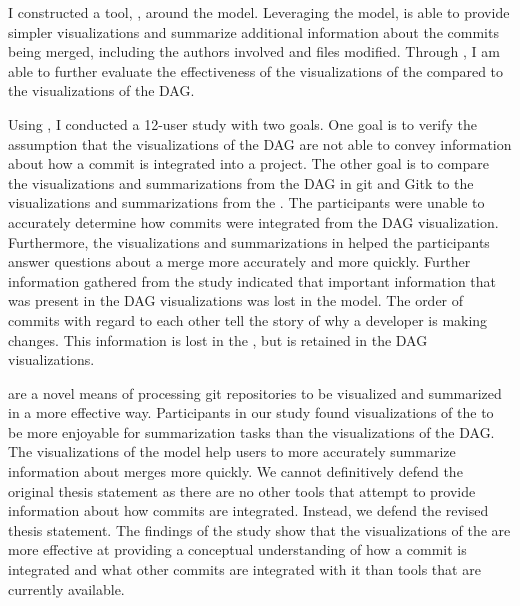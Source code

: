 I constructed a tool, \tool{}, around the \mt{} model. Leveraging the
model, \tool{} is able to provide simpler visualizations and summarize
additional information about the commits being merged, including the
authors involved and files modified. Through \tool{}, I am able to
further evaluate the effectiveness of the visualizations of the \mt{}
compared to the visualizations of the DAG\@.

Using \tool{}, I conducted a 12-user study with two goals. One goal is
to verify the assumption that the visualizations of the DAG are not able
to convey information about how a commit is integrated into a project.
The other goal is to compare the visualizations and summarizations from
the DAG in git and Gitk to the visualizations and summarizations from
the \mt{}. The participants were unable to accurately determine how
commits were integrated from the DAG visualization. Furthermore, the
visualizations and summarizations in \tool{} helped the participants
answer questions about a merge more accurately and more quickly. Further
information gathered from the study indicated that important information
that was present in the DAG visualizations was lost in the \mt{} model.
The order of commits with regard to each other tell the story of why a
developer is making changes. This information is lost in the \mt{}, but
is retained in the DAG visualizations.

 are a novel means of processing git repositories to be visualized
and summarized in a more effective way. Participants in our study found
visualizations of the \mt{} to be more enjoyable for summarization tasks
than the visualizations of the DAG\@.
The visualizations of the \mt{}
model help users to more accurately summarize information about merges
more quickly.
We cannot definitively defend the original thesis statement as there
are no other tools that attempt to provide information about how
commits are integrated.
Instead, we defend the revised thesis statement.
The findings of the study show that the visualizations of the \mt{} are more effective at providing a
conceptual understanding of how a commit is integrated and what other
commits are integrated with it than tools that are currently available.
